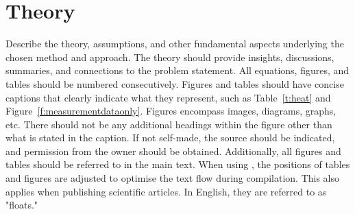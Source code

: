 \documentclass[a4paper]{article}
\begin{document}
\newpage
\section{Theory}\label{s:theory}
Describe the theory, assumptions, and other fundamental aspects underlying the chosen method and approach. The theory should provide insights, discussions, summaries, and connections to the problem statement. All equations, figures, and tables should be numbered consecutively. Figures and tables should have concise captions that clearly indicate what they represent, such as Table~\ref{t:heat} and Figure~\ref{f:measurementdataonly}. Figures encompass images, diagrams, graphs, etc. There should not be any additional headings within the figure other than what is stated in the caption. If not self-made, the source should be indicated, and permission from the owner should be obtained. Additionally, all figures and tables should be referred to in the main text. When using \LaTeXe, the positions of tables and figures are adjusted to optimise the text flow during compilation. This also applies when publishing scientific articles. In English, they are referred to as "floats."
\end{document}
